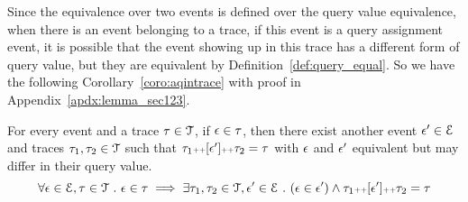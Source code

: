 %
Since the equivalence over two events is defined over the query value equivalence, 
when there is an event belonging to a trace, 
if this event is a query assignment event, 
it is possible that 
the event showing up in this trace has a different form of query value, 
but they are equivalent by Definition~\ref{def:query_equal}.
So we have the following Corollary~\ref{coro:aqintrace} with proof in Appendix~\ref{apdx:lemma_sec123}.
\begin{coro}
\label{coro:aqintrace}
For every event and a trace $\mathtt{\tau} \in \mathcal{T}$,
if $\mathtt{\epsilon} \in \mathtt{\tau}$, 
then there exist another event $\mathtt{\epsilon}' \in \mathcal{E}$ and traces $\mathtt{\tau}_1, \mathtt{\tau}_2 \in \mathcal{T}$
such that $\mathtt{\tau}_1 {\scriptscriptstyle ++} [\mathtt{\epsilon}'] {\scriptscriptstyle ++} \mathtt{\tau}_2 = \mathtt{\tau} $
with 
$\mathtt{\epsilon}$ and $\mathtt{\epsilon}'$ equivalent but may differ in their query value.
\[
  \forall \mathtt{\epsilon} \in \mathcal{E}, \mathtt{\tau} \in \mathcal{T} ~.~
\mathtt{\epsilon} \in \mathtt{\tau} \implies \exists \mathtt{\tau}_1, \mathtt{\tau}_2 \in \mathcal{T}, 
\mathtt{\epsilon}' \in \mathcal{E} ~.~ (\mathtt{\epsilon} \in \mathtt{\epsilon}') \land \mathtt{\tau}_1 {\scriptscriptstyle ++} [\mathtt{\epsilon}'] {\scriptscriptstyle ++} \mathtt{\tau}_2 = \mathtt{\tau}  
\]
\end{coro}
